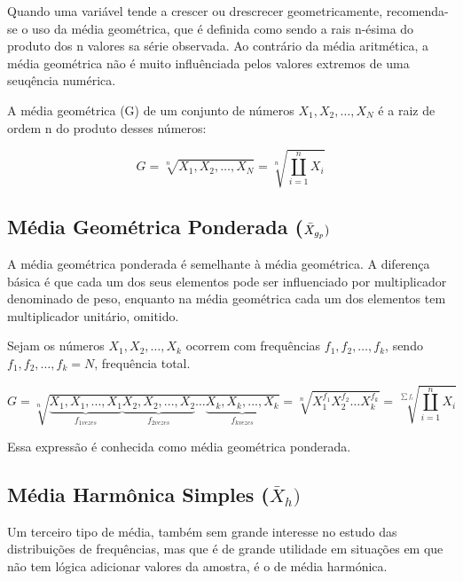 Quando uma variável tende a crescer ou drescrecer geometricamente, recomenda-se o uso da média geométrica, que é definida como sendo a rais n-ésima do produto dos n valores sa série observada. Ao contrário da média aritmética, a média geométrica não é muito influênciada pelos valores extremos de uma seuqência numérica.\vskip0.3cm


A média geométrica (G) de um conjunto de números $X_{1},X_{2},\ldots,X_{N}$ é a raiz de ordem n do produto
desses números:

\begin{equation}\label{Geometrica}
    G=\sqrt[n]{X_{1},X_{2},\ldots,X_{N}}=\sqrt[n]{\coprod_{i=1}^{n}X_{i}}
\end{equation}


\subsection{Média Geométrica Ponderada ($\Bar{X}_{g_{p}})$}

A média geométrica ponderada é semelhante à média geométrica. A diferença básica é que cada um dos seus elementos pode ser influenciado por multiplicador denominado de peso, enquanto na média geométrica cada um dos elementos tem multiplicador unitário, omitido.\vskip0.3cm


Sejam os números $X_{1},X_{2},\ldots,X_{k}$ ocorrem com frequências $f_{1},f_{2},\ldots,f_{k}$, sendo $f_{1},f_{2},\ldots,f_{k}=N$, frequência total.


\begin{equation}\label{Geometrica}
    G=\sqrt[n]{\underbrace{X_{1},X_{1},...,X_{1}}_{f_{1vezes}}\underbrace{X_{2},X_{2},...,X_{2}}_{f_{2vezes}} \ldots \underbrace{X_{k},X_{k},...,X_{k}}_{f_{kvezes}}}=\sqrt[n]{X_{1}^{f_{1}}X_{2}^{f_{2}}\ldots X_{k}^{f_{k}}}
 = \sqrt[\sum f_{i}]{\coprod_{i=1}^{n}X_{i}}
\end{equation}

Essa expressão é conhecida como média geométrica ponderada.

\newpage
\subsection{Média Harmônica Simples ($\bar{X}_{h})$}

Um terceiro tipo de média, também sem grande interesse no estudo das
distribuições de frequências, mas que é de grande utilidade em situações em que não
tem lógica adicionar valores da amostra, é o de média harmónica.\vskip0.3cm



